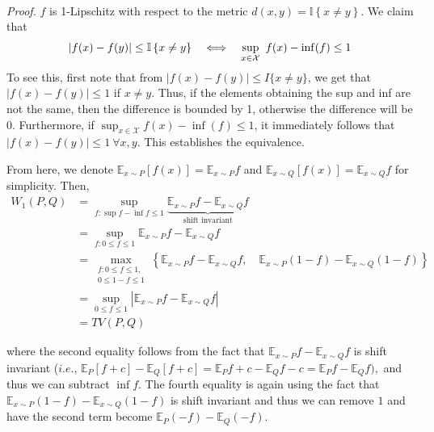 \documentclass[11pt]{article}
\newcommand\bbE{\ensuremath{\mathbb{E}}} %
\newcommand{\abs}[1]{\left\lvert #1 \right\rvert} %
\newcommand{\1}{\mathbb{I}} %
\begin{document}
\\
\textit{Proof.} $f$ is 1-Lipschitz with respect to the metric $d(x,y) = \1 \left\{ x \neq y \right\}$. We claim that
\begin{align*}
    \abs{f(x) - f(y)} \le \1 \left\{ x \neq y \right\} \quad \Longleftrightarrow \quad \underset{x \in \mathcal{X}}{\sup} \hspace{0.5em} f(x) - \inf(f) \le 1
\end{align*}
To see this, first note that from $|f(x)-f(y)|\le I\{x\ne y\}$, we get that $|f(x)-f(y)|\le 1$ if $x\ne y$. Thus, if the elements obtaining the sup and inf are not the same, then the difference is bounded by 1, otherwise the difference will be 0. Furthermore, if $\sup_{x \in \mathcal{X}} f(x)- \inf(f) \le 1$, it immediately follows that $|f(x) - f(y)| \le 1 \ \forall x, y$. This establishes the equivalence.

From here, we denote $\bbE_{x \sim P} \left[ f(x) \right] =\bbE_{x \sim P} f $ and $\bbE_{x \sim Q} \left[ f(x) \right] =\bbE_{x \sim Q} f $ for simplicity. Then,
\begin{align*}
    W_1(P,Q) &= \underset{f: \sup f - \inf f \le 1}{\sup} \underbrace{\bbE_{x \sim P} f - \bbE_{x \sim Q} f}_{\text{shift invariant}} \\
    &= \underset{f: 0 \le f \le 1}{\sup} \bbE_{x \sim P}f - \bbE_{x \sim Q}f \\
    &= \underset{\substack{{f: 0 \le f \le 1,}\\ {0 \le 1-f \le 1}}}{\max} \left\{ \bbE_{x \sim P} f - \bbE_{x \sim Q} f, \quad \bbE_{x \sim P} (1-f) - \bbE_{x \sim Q} (1-f)  \right\} \\
    &= \underset{0 \le f \le 1}{\sup} \abs{\bbE_{x \sim P} f - \bbE_{x \sim Q} f} \\
    &= TV(P,Q)
\end{align*}

\noindent where the second equality follows from the fact that $\bbE_{x \sim P} f - \bbE_{x \sim Q} f$ is shift invariant ($i.e.$, $\bbE_P [f + c] - \bbE_Q [f + c] = \bbE_P f + c - \bbE_Q f - c = \bbE_P f - \bbE_Q f),$ and thus we can subtract $\inf f$. The fourth equality is again using the fact that $\bbE_{x \sim P} (1-f) - \bbE_{x \sim Q} (1-f)$ is shift invariant and thus we can remove $1$ and have the second term become $\bbE_P(-f) - \bbE_Q(-f)$.
\end{document}
